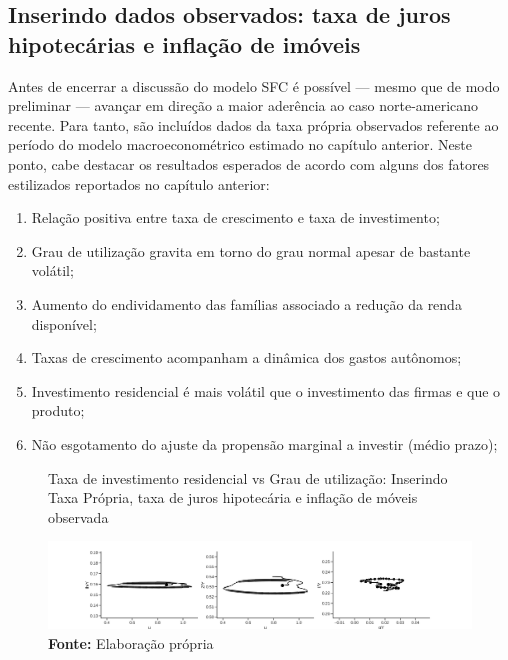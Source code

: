 \subsection*{Inserindo dados observados: taxa de juros hipotecárias e inflação de imóveis}

Antes de encerrar a discussão do modelo SFC é possível  --- mesmo que de modo preliminar --- avançar em direção a maior aderência ao caso norte-americano recente.
Para tanto, são incluídos dados da taxa própria observados referente ao período do modelo macroeconométrico estimado no capítulo anterior.
Neste ponto, cabe destacar os resultados esperados de acordo com 
alguns dos fatores estilizados reportados no capítulo anterior:

\begin{enumerate}
\item Relação positiva entre taxa de crescimento e taxa de investimento;
\item Grau de utilização gravita em torno do grau normal apesar de bastante volátil;
\item Aumento do endividamento das famílias associado a redução da renda disponível;
\item Taxas de crescimento acompanham a dinâmica dos gastos autônomos;
\item Investimento residencial é mais volátil que o investimento das firmas e que o produto;
\item Não esgotamento do ajuste da propensão marginal a investir (médio prazo);
\end{enumerate}

\begin{figure}[H]
	\centering
	\caption{Taxa de investimento residencial vs Grau de utilização: Inserindo Taxa Própria, taxa de juros hipotecária e inflação de móveis observada}
	\label{clock_Real}
	\includegraphics[width=\textwidth]{../../Modelo/Versoes/Clock_Real.png}
	\caption*{\textbf{Fonte:} Elaboração própria}
\end{figure}

